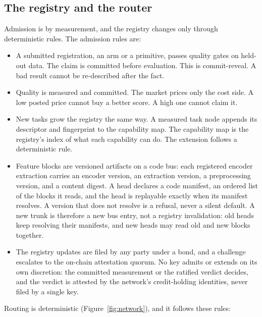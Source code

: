 \documentclass[11pt]{article}
\begin{document}
\subsection{The registry and the router}\label{sec:router}

Admission is by measurement, and the registry changes only
through deterministic rules. The admission rules are:
\begin{itemize}
    \item A submitted registration, an arm or a primitive, passes
          quality gates on held-out data. The claim is committed before
          evaluation. This is commit-reveal. A bad result cannot be
          re-described after the fact.
    \item Quality is measured and committed. The market prices only the
          cost side. A low posted price cannot buy a better score. A high
          one cannot claim it.
    \item New tasks grow the registry the same way. A measured task
          node appends its descriptor and fingerprint to the capability
          map. The capability map is the registry's index of what each
          capability can do. The extension follows a deterministic rule.
    \item Feature blocks are versioned artifacts on a code bus: each
          registered encoder extraction carries an encoder version, an
          extraction version, a preprocessing version, and a content
          digest. A head declares a code manifest, an ordered list of
          the blocks it reads, and the head is replayable exactly when
          its manifest resolves. A version that does not resolve is a
          refusal, never a silent default. A new trunk is therefore a new
          bus entry, not a registry invalidation: old heads keep resolving
          their manifests, and new heads may read old and new blocks
          together.
    \item The registry updates are filed by any party under a bond,
          and a challenge escalates to the on-chain attestation quorum. No
          key admits or extends on its own discretion: the committed
          measurement or the ratified verdict decides, and the verdict is
          attested by the network's credit-holding identities, never filed
          by a single key.
\end{itemize}
Routing is deterministic
(Figure~\ref{fig:network}), and it follows these rules:
\end{document}
